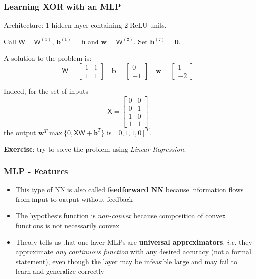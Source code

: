 \documentclass{beamer}
\begin{document}
	\begin{frame}
		\frametitle{Learning XOR with an MLP}
		Architecture: 1 hidden layer containing 2 ReLU units.
		
		\vspace{5mm}
		
		Call $\mathsf{W} = \mathsf{W}^{(1)}$, $\bm{b}^{(1)} = \bm{b}$ and $\bm{w} =  \mathsf{W}^{(2)}$. Set $\bm{b}^{(2)} = \bm{0}$.
		
		\vspace{5mm}
		
		A solution to the problem is:
		$$\mathsf{W} = \begin{bmatrix}
			 1 & 1\\
			 1 & 1
		\end{bmatrix} \quad 
		\bm{b} = \begin{bmatrix}
		0 \\
		-1
		\end{bmatrix} \quad 
		\bm{w} = \begin{bmatrix}
			1 \\
			-2
		\end{bmatrix}
		$$
		
		Indeed, for the set of inputs
		$$\mathsf{X} = \begin{bmatrix}
			0 & 0\\
			0 & 1 \\
			1 & 0 \\
			1 & 1
			\end{bmatrix}
		$$
		the output $\bm{w}^T \max \{0, \mathsf{XW} + \bm{b}^T\}$ is $[0, 1, 1, 0]^T$.
		
		\vspace{5mm}
		
		\textbf{Exercise}: try to solve the problem using \textit{Linear Regression}.
		
	\end{frame}

	\begin{frame}
	\frametitle{MLP - Features}
	\begin{itemize}
		\setlength\itemsep{5mm}
		\item This type of NN is also called \textbf{feedforward NN} because information flows from input to output without feedback
		\item The hypothesis function is \textit{ non-convex} because composition of convex functions is not necessarily convex
		\item Theory tells us that one-layer MLPs are \textbf{universal approximators}, \textit{i.e.} they approximate \textit{any continuous function} with any desired accuracy (not a formal statement), even though the layer may be infeasible large and may fail to learn and generalize correctly
	\end{itemize}
\end{frame}
\end{document}

